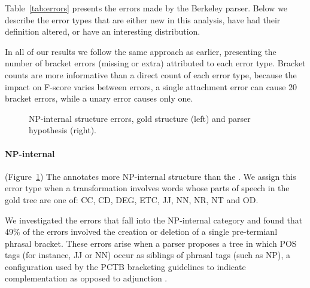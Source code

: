 Table~\ref{tab:errors} presents the errors made by the Berkeley parser.
Below we describe the error types that are either new in this analysis, have had their definition altered, or have an interesting distribution.

In all of our results we follow the same approach as earlier, presenting the number of bracket errors (missing or extra) attributed to each error type.
Bracket counts are more informative than a direct count of each error type, because the impact on \parseval F-score varies between errors, \myeg a single attachment error can cause 20 bracket errors, while a unary error causes only one.

\begin{figure}
\centering
  \caption[Error analysis example: NP internal (Chinese).]{ \label{fig:np_internal} 
    NP-internal structure errors, gold structure (left) and parser hypothesis (right).
  }
\end{figure}

\paragraph{NP-internal} (Figure~\ref{fig:np_internal})
The \pctb annotates more NP-internal structure than the \ptb.
We assign this error type when a transformation involves words whose parts of speech in the gold tree are one of: CC, CD, DEG, ETC, JJ, NN, NR, NT and OD.

We investigated the errors that fall into the NP-internal category and found that 49\% of the errors involved the creation or deletion of a single pre-termianl phrasal bracket.
These errors arise when a parser proposes a tree in which POS tags (for instance, JJ or NN) occur as siblings of phrasal tags (such as NP), a configuration used by the PCTB bracketing guidelines to indicate complementation as opposed to adjunction \parencite{Xue:2005:NLE}.

